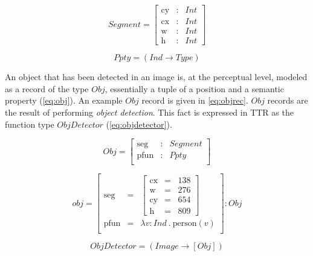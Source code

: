 \documentclass[11pt, a4paper]{article}
\begin{document}
\begin{equation}\label{eq:seg}
Segment = \left[\begin{array}{rcl}
\text{cy} &:& Int\\
\text{cx} &:& Int\\
\text{w} &:& Int\\
\text{h} &:& Int
\end{array}\right]\end{equation}

\begin{equation}\label{eq:ppty}
Ppty = (Ind \rightarrow Type)\end{equation}

An object that has been detected in an image is, at the perceptual level, modeled as a record of the type $Obj$, essentially a tuple of a position and a semantic property (\autoref{eq:obj}).
An example $Obj$ record is given in \autoref{eq:objrec}.
$Obj$ records are the result of performing \textit{object detection}.
This fact is expressed in TTR as the function type $ObjDetector$ (\autoref{eq:objdetector}).

\begin{equation}\label{eq:obj}
Obj = \left[\begin{array}{rcl}
\text{seg} &:& Segment\\
\text{pfun} &:& Ppty \\
\end{array}\right]\end{equation}

\begin{equation}\label{eq:objrec}
obj =
\left[\begin{array}{rcl}
\text{seg} &=& \left[\begin{array}{rcl}
\text{cx} &=& 138\\
\text{w} &=& 276\\
\text{cy} &=& 654\\
\text{h} &=& 809
\end{array}\right]\\
\text{pfun} &=& \lambda v:Ind\ .\ \text{person}(v)\\
\end{array}\right] : Obj\end{equation}


\begin{equation}\label{eq:objdetector}
ObjDetector = ( Image \rightarrow [Obj] )
\end{equation}
\end{document}
